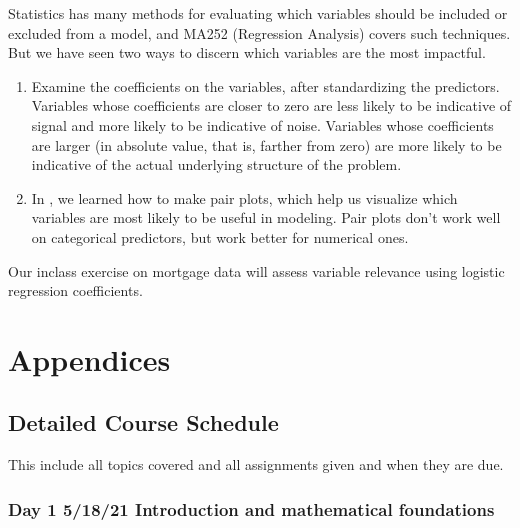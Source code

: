 \documentclass[letterpaper,10pt,english]{jupyterBook}
\begin{document}
\sphinxAtStartPar
Statistics has many methods for evaluating which variables should be included or excluded from a model, and MA252 (Regression Analysis) covers such techniques.  But we have seen two ways to discern which variables are the most impactful.
\begin{enumerate}
%
\item {} 
\sphinxAtStartPar
Examine the coefficients on the variables, after standardizing the predictors.  Variables whose coefficients are closer to zero are less likely to be indicative of signal and more likely to be indicative of noise.  Variables whose coefficients are larger (in absolute value, that is, farther from zero) are more likely to be indicative of the actual underlying structure of the problem.

\item {} 
\sphinxAtStartPar
In {\hyperref[\detokenize{chapter-10-visualization::doc}]{}}, we learned how to make pair plots, which help us visualize which variables are most likely to be useful in modeling.  Pair plots don’t work well on categorical predictors, but work better for numerical ones.

\end{enumerate}

\sphinxAtStartPar
Our in\sphinxhyphen{}class exercise on mortgage data will assess variable relevance using logistic regression coefficients.


\part{Appendices}


\chapter{Detailed Course Schedule}
\label{\detokenize{course-schedule:detailed-course-schedule}}\label{\detokenize{course-schedule::doc}}
\sphinxAtStartPar
This include all topics covered and all assignments given and when they are due.


\section{Day 1 \sphinxhyphen{} 5/18/21 \sphinxhyphen{} Introduction and mathematical foundations}
\label{\detokenize{course-schedule:day-1-5-18-21-introduction-and-mathematical-foundations}}
\end{document}
